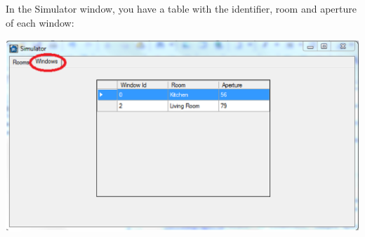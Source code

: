In the Simulator window, you have a table with the identifier, room and aperture of each window:
\begin{center}
	\includegraphics[width=.75\linewidth]{images/simulatorWindow.eps}
	\\
\vspace{1cm}
\end{center}